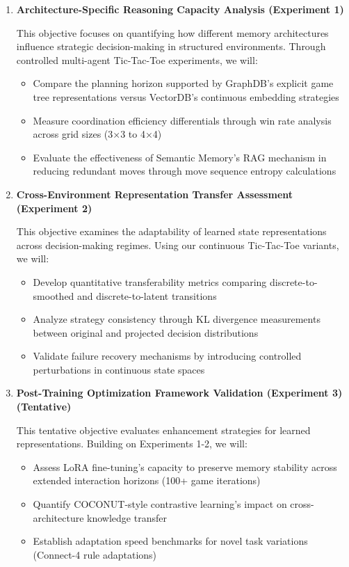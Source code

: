 \documentclass[11pt]{article}
\begin{document}
\begin{enumerate}
    \item \textbf{Architecture-Specific Reasoning Capacity Analysis (Experiment 1)}
    
    This objective focuses on quantifying how different memory architectures influence strategic decision-making in structured environments. Through controlled multi-agent Tic-Tac-Toe experiments, we will:
    
    \begin{itemize}
        \item Compare the planning horizon supported by GraphDB's explicit game tree representations versus VectorDB's continuous embedding strategies
        \item Measure coordination efficiency differentials through win rate analysis across grid sizes (3×3 to 4×4)
        \item Evaluate the effectiveness of Semantic Memory's RAG mechanism in reducing redundant moves through move sequence entropy calculations
    \end{itemize}

    \item \textbf{Cross-Environment Representation Transfer Assessment (Experiment 2)}
    
    This objective examines the adaptability of learned state representations across decision-making regimes. Using our continuous Tic-Tac-Toe variants, we will:
    
    \begin{itemize}
        \item Develop quantitative transferability metrics comparing discrete-to-smoothed and discrete-to-latent transitions
        \item Analyze strategy consistency through KL divergence measurements between original and projected decision distributions
        \item Validate failure recovery mechanisms by introducing controlled perturbations in continuous state spaces
    \end{itemize}

    \item \textbf{Post-Training Optimization Framework Validation (Experiment 3) (Tentative)}
    
    This tentative objective evaluates enhancement strategies for learned representations. Building on Experiments 1-2, we will:
    
    \begin{itemize}
        \item Assess LoRA fine-tuning's capacity to preserve memory stability across extended interaction horizons (100+ game iterations)
        \item Quantify COCONUT-style contrastive learning's impact on cross-architecture knowledge transfer
        \item Establish adaptation speed benchmarks for novel task variations (Connect-4 rule adaptations)
    \end{itemize}
\end{enumerate}
\end{document}
